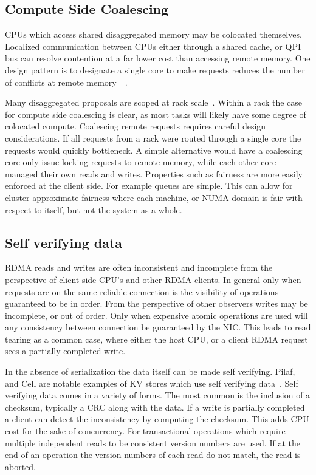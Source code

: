 \subsection{Compute Side Coalescing}
CPUs which access shared disaggregated memory may be colocated themselves.
Localized communication between CPUs either through a shared cache, or QPI bus
can resolve contention at a far lower cost than accessing remote memory.
One design pattern is to designate a single core to make requests reduces the
number of conflicts at remote memory~\cite{flat-combine}~\cite{sherman}. 

Many disaggregated proposals are scoped at rack scale~\cite{disandapp}. Within a
rack the case for compute side coalescing is clear, as most tasks will likely
have some degree of colocated compute. Coalescing remote requests requires
careful design considerations. If all requests from a rack were routed through a
single core the requests would quickly bottleneck. A simple alternative would
have a coalescing core only issue locking requests to remote memory, while each
other core managed their own reads and writes.
Properties such as fairness are more easily enforced at the client side. For
example queues are simple. This can allow for cluster approximate fairness where
each machine, or NUMA domain is fair with respect to itself, but not the system
as a whole.

\subsection{Self verifying data} 
RDMA reads and writes are often inconsistent and incomplete from the perspective
of client side CPU's and other RDMA clients. In general only when requests are
on the same reliable connection is the visibility of operations guaranteed to be
in order. From the perspective of other observers writes may be incomplete, or
out of order. Only when expensive atomic operations are used will any
consistency between connection be guaranteed by the NIC.  This leads to read
tearing as a common case, where either the host CPU, or a client RDMA request
sees a partially completed write. 

In the absence of serialization the data itself can be made self verifying.
Pilaf, and Cell are notable examples of KV stores which use self verifying
data~\cite{pilaf,cell}. Self verifying data comes in a variety of forms. The
most common is the inclusion of a checksum, typically a CRC along with the data.
If a write is partially completed a client can detect the inconsistency by
computing the checksum. This adds CPU cost for the sake of concurrency. For
transactional operations which require multiple independent reads to be
consistent version numbers are used. If at the end of an operation the version
numbers of each read do not match, the read is aborted.


